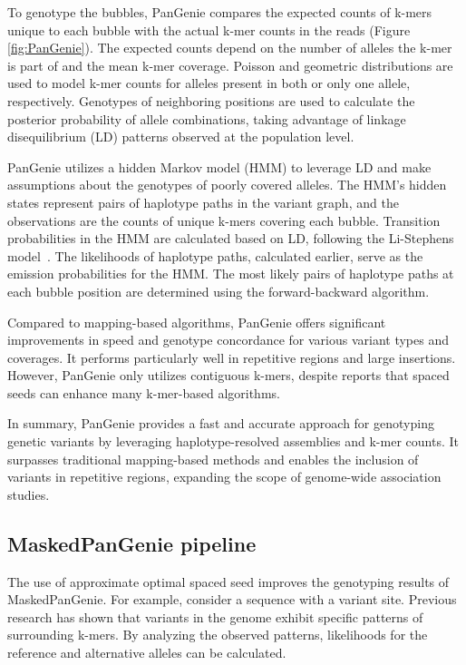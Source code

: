 \documentclass{PHlab-thesis}
\begin{document}
To genotype the bubbles, PanGenie compares the expected counts of k-mers unique to each bubble with the actual k-mer counts in the reads (Figure \ref{fig:PanGenie}). The expected counts depend on the number of alleles the k-mer is part of and the mean k-mer coverage. Poisson and geometric distributions are used to model k-mer counts for alleles present in both or only one allele, respectively. Genotypes of neighboring positions are used to calculate the posterior probability of allele combinations, taking advantage of linkage disequilibrium (LD) patterns observed at the population level.

PanGenie utilizes a hidden Markov model (HMM) to leverage LD and make assumptions about the genotypes of poorly covered alleles. The HMM's hidden states represent pairs of haplotype paths in the variant graph, and the observations are the counts of unique k-mers covering each bubble. Transition probabilities in the HMM are calculated based on LD, following the Li-Stephens model~\cite{Li2003linkage}. The likelihoods of haplotype paths, calculated earlier, serve as the emission probabilities for the HMM. The most likely pairs of haplotype paths at each bubble position are determined using the forward-backward algorithm.

Compared to mapping-based algorithms, PanGenie offers significant improvements in speed and genotype concordance for various variant types and coverages. It performs particularly well in repetitive regions and large insertions. However, PanGenie only utilizes contiguous k-mers, despite reports that spaced seeds can enhance many k-mer-based algorithms.

In summary, PanGenie provides a fast and accurate approach for genotyping genetic variants by leveraging haplotype-resolved assemblies and k-mer counts. It surpasses traditional mapping-based methods and enables the inclusion of variants in repetitive regions, expanding the scope of genome-wide association studies.
\subsection{MaskedPanGenie pipeline}
The use of approximate optimal spaced seed improves the genotyping results of MaskedPanGenie. For example, consider a sequence with a variant site. Previous research has shown that variants in the genome exhibit specific patterns of surrounding k-mers. By analyzing the observed patterns, likelihoods for the reference and alternative alleles can be calculated.
\end{document}
